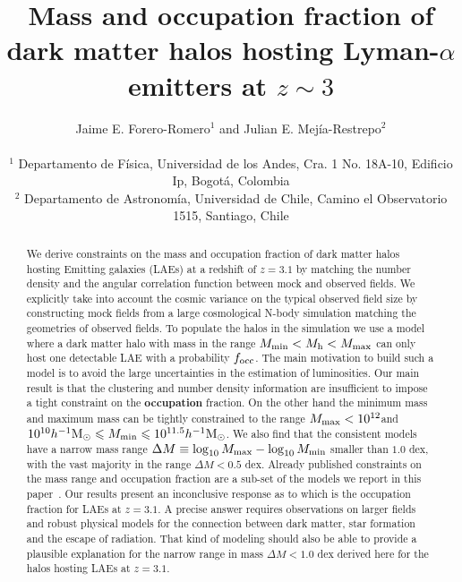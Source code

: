 \documentclass[usenatbib]{mn2e}
\newcommand{\documentname}{paper~}
\newcommand{\ly}{{\ifmmode{{\rm Ly}\alpha}\else{Ly$\alpha$~}\fi}}
\newcommand{\hMsun}{{\ifmmode{h^{-1}{\rm
        {M_{\odot}}}}\else{$h^{-1}{\rm{M_{\odot}}}$}\fi}}
\begin{document}
\title[Halo mass and occupation fraction of LAEs at$z=3.1$]{Mass and
  occupation fraction of dark matter halos hosting Lyman-$\alpha$
  emitters at $z\sim 3$}      
\author[~J.~E. Forero-Romero and ~J.~E. Mejia-Restrepo]{
\parbox[t]{\textwidth}{\raggedright 
  Jaime E. Forero-Romero$^{1}$ and
  Julian E. Mej\'ia-Restrepo$^{2}$ 
}
\vspace*{6pt}\\
$^{1}$ Departamento de F\'{i}sica, Universidad de los Andes, Cra. 1
No. 18A-10, Edificio Ip, Bogot\'a, Colombia \\
$^{2}$ Departamento de Astronom\'{i}a, Universidad de Chile, Camino el
Observatorio 1515, Santiago, Chile} 

\maketitle

\begin{abstract}
%
We derive constraints on the mass and occupation fraction of dark
matter halos hosting \ly Emitting galaxies (LAEs) at a redshift of
$z=3.1$ by matching the number density and the angular
correlation function between mock and observed fields. We explicitly
take into account the cosmic variance on the typical observed field
size by constructing mock fields from a large cosmological N-body
simulation matching the geometries of observed fields. To populate the
halos in the simulation we use a model where a dark matter halo with
mass in the range $M_{\rm min}<M_{\rm h}<M_{\rm max}$ can only host
one detectable LAE with a probability $f_{\rm occ}$. The main motivation to
build such a model is to avoid the large uncertainties in the
estimation of \ly luminosities. Our main result is that the clustering
and number density information are insufficient to impose a tight
constraint on the {\bf occupation} fraction. On the other hand the
minimum mass and maximum mass can be tightly constrained to the range
$M_{\rm max}<10^{12}$\hMsun and $10^{10}\hMsun\leq M_{\rm min}\leq
10^{11.5}\hMsun$.  We also find that the consistent models have a narrow mass
range $\Delta M \equiv \log_{10}M_{\rm max} - \log_{10} M_{\rm min}$
smaller than $1.0$ dex, with the vast majority in the range $\Delta
M<0.5$ dex. Already published constraints on the mass range and
occupation fraction are a sub-set of the models we report in this
\documentname. Our results present an inconclusive response as to
which is the occupation fraction for LAEs at $z=3.1$. A precise answer
requires observations on larger fields and robust physical models for
the connection between dark matter, star formation and the escape of
\ly radiation. That kind of modeling should also be able to provide a
plausible explanation for the narrow range in mass $\Delta M<1.0$ dex
derived here for the halos hosting LAEs at $z=3.1$.     

\end{abstract}
\end{document}
